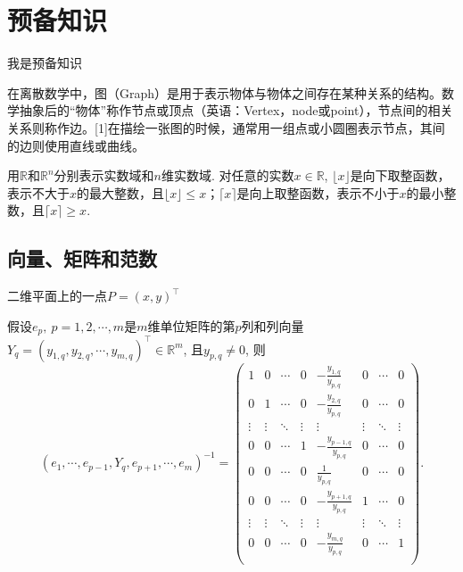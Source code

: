 \chapter{预备知识}  %
我是预备知识

在离散数学中，图（Graph）是用于表示物体与物体之间存在某种关系的结构。数学抽象后的“物体”称作节点或顶点（英语：Vertex，node或point），节点间的相关关系则称作边。[1]在描绘一张图的时候，通常用一组点或小圆圈表示节点，其间的边则使用直线或曲线。

用$\mathbb{R}$和$\mathbb{R}^{n}$分别表示实数域和$n$维实数域. 对任意的实数$x \in \mathbb{R}$, $\lfloor x \rfloor$是向下取整函数，表示不大于$x$的最大整数，且$ \lfloor x \rfloor \leq x$；$\lceil x \rceil$是向上取整函数，表示不小于$x$的最小整数，且$\lceil x \rceil \geq x$.
 
\section{向量、矩阵和范数}
二维平面上的一点$P=(x,y)^{\top}$

\begin{lemma}\label{Lemma4EmYqK}
	假设$e_p,~p=1,2,\cdots,m$是$m$维单位矩阵的第$p$列和列向量$Y_{q} = \left( y_{1,q}, y_{2,q}, \cdots, y_{m,q} \right)^\top \in \mathbb{R}^{m}$, 且$y_{p,q} \neq 0$,  则
	\begin{equation*}
	 \left( e_1, \cdots,e_{p-1}, Y_{q}, e_{p+1}, \cdots, e_m \right)^{-1}  = 
	  	   		\begin{pmatrix} 
		  		1 	   & 0      & \cdots  & 0 			  & -\frac{y_{1,q}}{y_{p,q}}  	& 0 	& \cdots   & 0\\
		  		0 	   & 1      & \cdots  & 0 			  & -\frac{y_{2,q}}{y_{p,q}}  	& 0 	& \cdots   & 0\\
		  		\vdots & \vdots & \ddots  & \vdots 	      &  \vdots     	& \vdots  	& \ddots  & \vdots\\
		  		0      & 0      & \cdots  & 1  			  & -\frac{y_{p-1,q}}{y_{p,q}}  	& 0 	& \cdots   & 0\\	  		
		  		0      & 0      & \cdots  & 0  			  & \frac{1}{y_{p,q}}  	& 0 	& \cdots   & 0\\
		  		0      & 0      & \cdots  & 0  			  & -\frac{y_{p+1,q}}{y_{p,q}}  	& 1 	& \cdots   & 0\\
		  		\vdots & \vdots & \ddots  & \vdots  	  & \vdots  		& \vdots  	& \ddots   & \vdots\\	
		  		0      & 0      & \cdots  & 0  			   & -\frac{y_{m,q}}{y_{p,q}}     & 0     & \cdots   & 1\\	  		
			\end{pmatrix} .
	\end{equation*}
\end{lemma}



